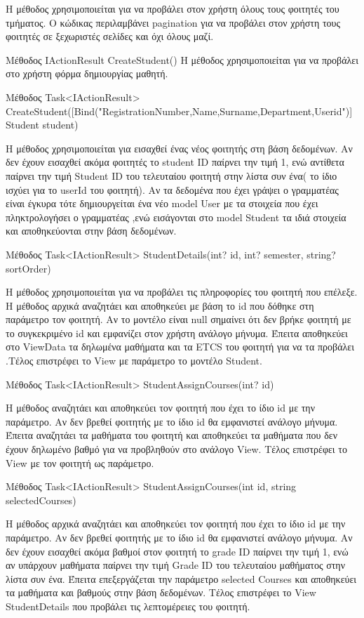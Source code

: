 \documentclass[12pt]{article}
\begin{document}
	Η μέθοδος χρησιμοποιείται για να προβάλει στον χρήστη όλους τους φοιτητές του τμήματος. Ο κώδικας περιλαμβάνει pagination για να προβάλει στον χρήστη τους φοιτητές σε ξεχωριστές σελίδες και όχι όλους μαζί. 
	
	
	Μέθοδος IActionResult CreateStudent()
	Η μέθοδος χρησιμοποιείται για να προβάλει στο χρήστη φόρμα δημιουργίας μαθητή.
	
	
	Μέθοδος Task<IActionResult> CreateStudent([Bind("RegistrationNumber,Name,Surname,Department,Userid")] Student student)
	
	Η μέθοδος χρησιμοποιείται για εισαχθεί ένας νέος φοιτητής στη βάση δεδομένων. Αν δεν έχουν εισαχθεί ακόμα φοιτητές το  student ID παίρνει την τιμή 1, ενώ αντίθετα παίρνει την τιμή Student ID του τελευταίου φοιτητή στην λίστα συν ένα( το ίδιο ισχύει για το userId του φοιτητή). Αν τα δεδομένα που έχει γράψει ο γραμματέας είναι έγκυρα τότε δημιουργείται ένα νέο model User με τα στοιχεία που έχει πληκτρολογήσει ο γραμματέας ,ενώ εισάγονται στο model Student τα ιδιά στοιχεία και αποθηκεύονται στην βάση δεδομένων.
	
	Μέθοδος Task<IActionResult> StudentDetails(int? id, int? semester, string? sortOrder)

	Η μέθοδος χρησιμοποιείται για να προβάλει τις πληροφορίες του φοιτητή που επέλεξε. Η μέθοδος αρχικά αναζητάει και αποθηκεύει με βάση το id που δόθηκε στη παράμετρο τον φοιτητή. Αν το μοντέλο είναι null σημαίνει ότι δεν βρήκε φοιτητή με το συγκεκριμένο id και εμφανίζει στον χρήστη ανάλογο μήνυμα. Έπειτα αποθηκεύει στο ViewData τα δηλωμένα μαθήματα και τα ETCS του φοιτητή για να τα προβάλει .Τέλος επιστρέφει το View με παράμετρο το μοντέλο Student.
	
	
	Μέθοδος Task<IActionResult> StudentAssignCourses(int? id)

	Η μέθοδος αναζητάει και αποθηκεύει τον φοιτητή που έχει το ίδιο id με την παράμετρο. Αν δεν βρεθεί φοιτητής με το ίδιο id θα εμφανιστεί ανάλογο μήνυμα. Έπειτα αναζητάει τα μαθήματα του φοιτητή και αποθηκεύει τα μαθήματα που δεν έχουν δηλωμένο βαθμό για να προβληθούν στο ανάλογο View. Τέλος επιστρέφει το View με τον φοιτητή ως παράμετρο.
	
	
	Μέθοδος Task<IActionResult> StudentAssignCourses(int id, string selectedCourses)
	
	Η μέθοδος αρχικά αναζητάει και αποθηκεύει τον φοιτητή που έχει το ίδιο id με την παράμετρο. Αν δεν βρεθεί φοιτητής με το ίδιο id θα εμφανιστεί ανάλογο μήνυμα. Αν δεν έχουν εισαχθεί ακόμα βαθμοί στον φοιτητή το  grade ID παίρνει την τιμή 1, ενώ αν υπάρχουν μαθήματα παίρνει την τιμή Grade ID του τελευταίου μαθήματος στην λίστα συν ένα. Έπειτα επεξεργάζεται την παράμετρο selected Courses και αποθηκεύει τα μαθήματα και βαθμούς στην βάση δεδομένων. Τέλος επιστρέφει το View StudentDetails που προβάλει τις λεπτομέρειες του φοιτητή.
	
\end{document}
